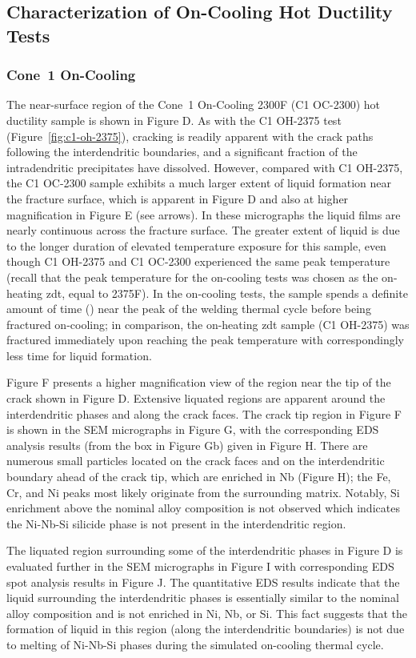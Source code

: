 \subsection{Characterization of On-Cooling Hot Ductility Tests}
\subsubsection{Cone~1 On-Cooling}
The near-surface region of the Cone~1 On-Cooling 2300F (C1 OC-2300) hot ductility sample is shown in Figure D. As with the C1 OH-2375 test (Figure~\ref{fig:c1-oh-2375}), cracking is readily apparent with the crack paths following the interdendritic boundaries, and a significant fraction of the intradendritic precipitates have dissolved. However, compared with C1 OH-2375, the C1 OC-2300 sample exhibits a much larger extent of liquid formation near the fracture surface, which is apparent in Figure D and also at higher magnification in Figure E (see arrows). In these micrographs the liquid films are nearly continuous across the fracture surface. The greater extent of liquid is due to the longer duration of elevated temperature exposure for this sample, even though C1 OH-2375 and C1 OC-2300 experienced the same peak temperature (recall that the peak temperature for the on-cooling tests was chosen as the on-heating \gls{zdt}, equal to 2375\textdegree{}F). In the on-cooling tests, the sample spends a definite amount of time () near the peak of the welding thermal cycle before being fractured on-cooling; in comparison, the on-heating \gls{zdt} sample (C1 OH-2375) was fractured immediately upon reaching the peak temperature with correspondingly less time for liquid formation.

Figure F presents a higher magnification view of the region near the tip of the crack shown in Figure D. Extensive liquated regions are apparent around the interdendritic phases and along the crack faces. The crack tip region in Figure F is shown in the SEM micrographs in Figure G, with the corresponding EDS analysis results (from the box in Figure Gb) given in Figure H. There are numerous small particles located on the crack faces and on the interdendritic boundary ahead of the crack tip, which are enriched in Nb (Figure H); the Fe, Cr, and Ni peaks most likely originate from the surrounding matrix. Notably, Si enrichment above the nominal alloy composition is not observed which indicates the Ni-Nb-Si silicide phase is not present in the interdendritic region. 

The liquated region surrounding some of the interdendritic phases in Figure D is evaluated further in the SEM micrographs in Figure I with corresponding EDS spot analysis results in Figure J. The quantitative EDS results indicate that the liquid surrounding the interdendritic phases is essentially similar to the nominal alloy composition and is not enriched in Ni, Nb, or Si. This fact suggests that the formation of liquid in this region (along the interdendritic boundaries) is not due to melting of Ni-Nb-Si phases during the simulated on-cooling thermal cycle.

